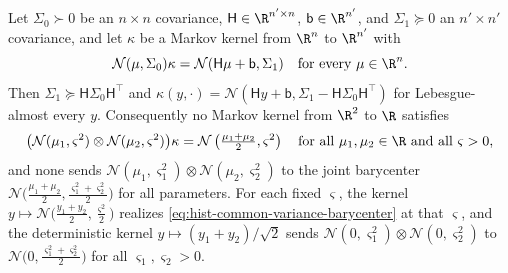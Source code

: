 Let $\Sigma_0\succ0$ be an $n\times n$ covariance, $\mathsf H\in\R^{n'\times n}$,
$\mathsf b\in\R^{n'}$, and $\Sigma_1\succeq0$ an $n'\times n'$ covariance, and let $\kappa$ be
a Markov kernel from $\R^n$ to $\R^{n'}$ with
\begin{equation}
\mathcal N(\mu,\Sigma_0)\kappa=\mathcal N(\mathsf H\mu+\mathsf b,\Sigma_1)
\quad\text{for every }\mu\in\R^n.
\label{eq:hist-gaussian-location-image}
\end{equation}
Then $\Sigma_1\succeq\mathsf H\Sigma_0\mathsf H^\top$ and
$\kappa(y,\cdot)=\mathcal N(\mathsf Hy+\mathsf b,\Sigma_1-\mathsf H\Sigma_0\mathsf H^\top)$ for
Lebesgue-almost every $y$.  Consequently no Markov kernel from $\R^2$ to $\R$ satisfies
\begin{equation}
\bigl(\mathcal N(\mu_1,\varsigma^2)\otimes\mathcal N(\mu_2,\varsigma^2)\bigr)\kappa
=\mathcal N\left(\tfrac{\mu_1+\mu_2}{2},\varsigma^2\right)
\quad\text{for all }\mu_1,\mu_2\in\R\text{ and all }\varsigma>0,
\label{eq:hist-common-variance-barycenter}
\end{equation}
and none sends $\mathcal N(\mu_1,\varsigma_1^2)\otimes\mathcal N(\mu_2,\varsigma_2^2)$ to
the joint barycenter $\mathcal N\bigl(\tfrac{\mu_1+\mu_2}{2},\tfrac{\varsigma_1^2+
\varsigma_2^2}{2}\bigr)$ for all parameters.  For each fixed $\varsigma$, the kernel
$y\mapsto\mathcal N\bigl(\tfrac{y_1+y_2}{2},\tfrac{\varsigma^2}{2}\bigr)$ realizes
\eqref{eq:hist-common-variance-barycenter} at that $\varsigma$, and the deterministic
kernel $y\mapsto(y_1+y_2)/\sqrt2$ sends $\mathcal N(0,\varsigma_1^2)\otimes\mathcal
N(0,\varsigma_2^2)$ to $\mathcal N\bigl(0,\tfrac{\varsigma_1^2+\varsigma_2^2}{2}\bigr)$ for
all $\varsigma_1,\varsigma_2>0$.  

